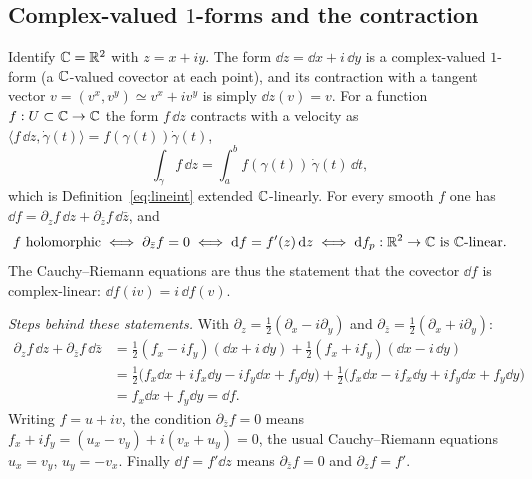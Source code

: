 \subsection{Complex-valued $1$-forms and the contraction}\label{sec:complexforms}

Identify $\mathbb{C}=\mathbb{R}^2$ with $z=x+iy$. The form $\dd z=\dd x+i\,\dd y$ is a complex-valued $1$-form (a $\mathbb{C}$-valued covector at each point), and its contraction with a tangent vector $v=(v^x,v^y)\simeq v^x+iv^y$ is simply $\dd z(v)=v$. For a function $f:U\subset\mathbb{C}\to\mathbb{C}$ the form $f\,\dd z$ contracts with a velocity as $\langle f\,\dd z,\dot\gamma(t)\rangle=f(\gamma(t))\dot\gamma(t)$,
\begin{equation}\label{eq:cint}
\int_\gamma f\,\dd z=\int_a^bf(\gamma(t))\,\dot\gamma(t)\,\dd t,
\end{equation}
which is Definition~\eqref{eq:lineint} extended $\mathbb{C}$-linearly. For every smooth $f$ one has $\dd f=\partial_zf\,\dd z+\partial_{\bar z}f\,\dd\bar z$, and
\begin{equation}\label{eq:holo}
f\text{ holomorphic}\iff\partial_{\bar z}f=0\iff\dd f=f'(z)\,\dd z\iff\dd f_p:\R^2\to\C\text{ is }\C\text{-linear}.
\end{equation}
The Cauchy--Riemann equations are thus the statement that the covector $\dd f$ is complex-linear: $\dd f(iv)=i\,\dd f(v)$.

\emph{Steps behind these statements.} With $\partial_z=\frac12(\partial_x-i\partial_y)$ and $\partial_{\bar z}=\frac12(\partial_x+i\partial_y)$:
\begin{align*}
\partial_zf\,\dd z+\partial_{\bar z}f\,\dd\bar z&=\tfrac12(f_x-if_y)(\dd x+i\,\dd y)+\tfrac12(f_x+if_y)(\dd x-i\,\dd y)\\
&=\tfrac12\bigl(f_x\dd x+if_x\dd y-if_y\dd x+f_y\dd y\bigr)+\tfrac12\bigl(f_x\dd x-if_x\dd y+if_y\dd x+f_y\dd y\bigr)\\
&=f_x\dd x+f_y\dd y=\dd f.
\end{align*}
Writing $f=u+iv$, the condition $\partial_{\bar z}f=0$ means $f_x+if_y=(u_x-v_y)+i(v_x+u_y)=0$, \ie the usual Cauchy--Riemann equations $u_x=v_y$, $u_y=-v_x$. Finally $\dd f=f'\dd z$ means $\partial_{\bar z}f=0$ and $\partial_zf=f'$.
